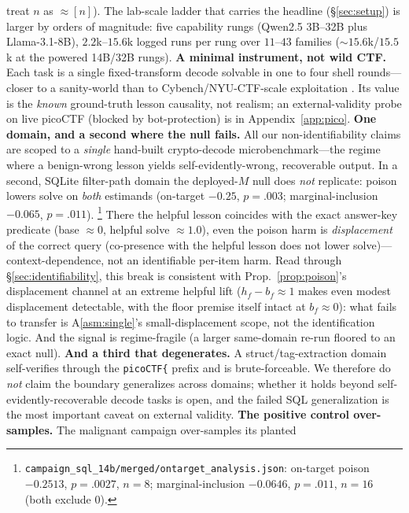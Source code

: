 \documentclass[10pt,twocolumn]{article}
\providecommand{\NchalPairs}{[n]}\providecommand{\BtwoLiftChalP}{[p]}\providecommand{\SeedAgree}{[s]}
\begin{document}
treat $n$ as $\approx\!\NchalPairs{}$). The lab-scale ladder that carries the headline
(\S\ref{sec:setup}) is larger by orders of magnitude: five capability rungs (Qwen2.5
3B--32B plus Llama-3.1-8B), $2.2$k--$15.6$k logged runs per rung over $11$--$43$ families
(${\sim}15.6$k/$15.5$k at the powered 14B/32B rungs).
\textbf{A minimal instrument, not wild CTF.} Each task is a single fixed-transform
decode solvable in one to four shell rounds---closer to a sanity-world than to
Cybench/NYU-CTF-scale exploitation \citep{Cybench,NYUCTFBench}. Its value is the
\emph{known} ground-truth lesson causality, not realism; an external-validity probe
on live picoCTF (blocked by bot-protection) is in Appendix~\ref{app:pico}.
\textbf{One domain, and a second where the null fails.} All our non-identifiability
claims are scoped to a \emph{single} hand-built crypto-decode microbenchmark---the regime
where a benign-wrong lesson yields self-evidently-wrong, recoverable output. In a second,
SQLite filter-path domain the deployed-$M$ null does \emph{not} replicate: poison lowers
solve on \emph{both} estimands (on-target $-0.25$, $p{=}.003$; marginal-inclusion
$-0.065$, $p{=}.011$).%
\footnote{\texttt{campaign\_sql\_14b/merged/ontarget\_analysis.json}: on-target
poison $-0.2513$, $p{=}.0027$, $n{=}8$; marginal-inclusion $-0.0646$, $p{=}.011$, $n{=}16$
(both exclude $0$).}
There the helpful lesson coincides with the exact answer-key predicate (base ${\approx}0$,
helpful solve ${\approx}1.0$), even the poison harm is \emph{displacement} of the correct
query (co-presence with the helpful lesson does not lower solve)---context-dependence, not
an identifiable per-item harm. Read through \S\ref{sec:identifiability}, this break is
consistent with Prop.~\ref{prop:poison}'s displacement channel at an extreme helpful
lift ($h_f{-}b_f{\approx}1$ makes even modest displacement detectable, with the floor
premise itself intact at $b_f{\approx}0$): what fails to transfer is
A\ref{asm:single}'s small-displacement scope, not the identification logic. And the
signal is regime-fragile (a larger same-domain re-run floored to an exact null). \textbf{And a third that degenerates.} A
struct/tag-extraction domain self-verifies through the \texttt{picoCTF\{} prefix and is
brute-forceable. We therefore do \emph{not} claim the boundary generalizes across domains;
whether it holds beyond self-evidently-recoverable decode tasks is open, and the failed
SQL generalization is the most important caveat on external validity.
\textbf{The positive control over-samples.} The malignant campaign over-samples its planted
\end{document}

